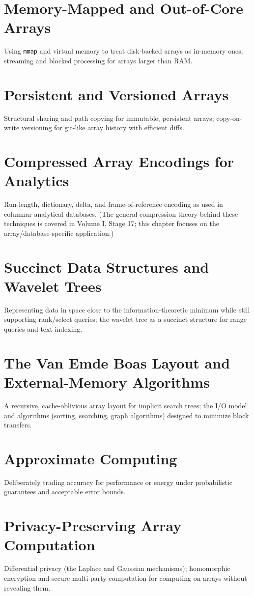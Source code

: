 \chapter{Memory-Mapped and Out-of-Core Arrays}
Using \texttt{mmap} and virtual memory to treat disk-backed arrays as in-memory ones; streaming and blocked processing for arrays larger than RAM.

\chapter{Persistent and Versioned Arrays}
Structural sharing and path copying for immutable, persistent arrays; copy-on-write versioning for git-like array history with efficient diffs.

\chapter{Compressed Array Encodings for Analytics}
Run-length, dictionary, delta, and frame-of-reference encoding as used in columnar analytical databases. (The general compression theory behind these techniques is covered in Volume I, Stage 17; this chapter focuses on the array/database-specific application.)

\chapter{Succinct Data Structures and Wavelet Trees}
Representing data in space close to the information-theoretic minimum while still supporting rank/select queries; the wavelet tree as a succinct structure for range queries and text indexing.

\chapter{The Van Emde Boas Layout and External-Memory Algorithms}
A recursive, cache-oblivious array layout for implicit search trees; the I/O model and algorithms (sorting, searching, graph algorithms) designed to minimize block transfers.

\chapter{Approximate Computing}
Deliberately trading accuracy for performance or energy under probabilistic guarantees and acceptable error bounds.

\chapter{Privacy-Preserving Array Computation}
Differential privacy (the Laplace and Gaussian mechanisms); homomorphic encryption and secure multi-party computation for computing on arrays without revealing them.

